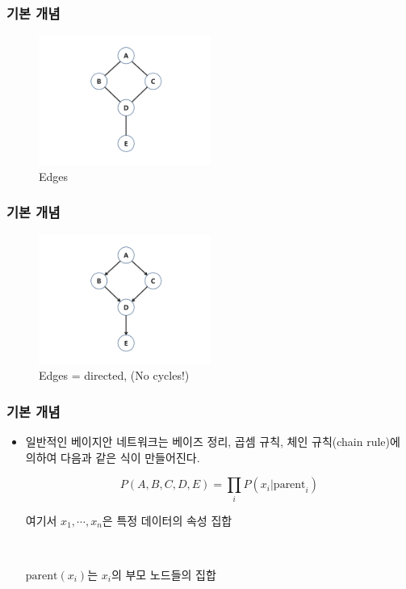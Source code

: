 \documentclass{beamer}
\begin{document}
\begin{frame}
\frametitle{기본 개념}

	\begin{figure}
		\includegraphics[height=120pt]{images/image92}
		\caption{{\scriptsize{}Edges}}
	\end{figure}

\end{frame}



\begin{frame}
\frametitle{기본 개념}

	\begin{figure}
		\includegraphics[height=120pt]{images/image93}
		\caption{{\scriptsize{}Edges = directed, (No cycles!)}}
	\end{figure}

\end{frame}



\begin{frame}
\frametitle{기본 개념}
{\scriptsize{}
	\begin{itemize}

		\item 일반적인 베이지안 네트워크는 베이즈 정리, 곱셈 규칙, 체인 규칙(chain rule)에 의하여 다음과 같은 식이 만들어진다.	

		$$P(A,B,C,D,E)=\prod_{i}P(x_{i}|\mbox{parent}_{i})$$
		
		여기서 $x_{1}, \cdots, x_{n}$은 특정 데이터의 속성 집합
		
		{}\		
		
		$\mbox{parent}(x_{i})$는 $x_{i}$의 부모 노드들의 집합
		
	\end{itemize}
}
\end{frame}
\end{document}
